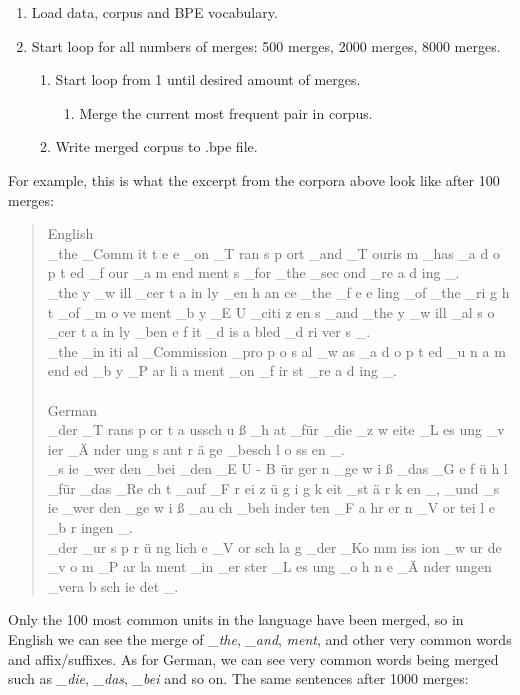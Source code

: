 \begin{enumerate}
	\item Load data, corpus and BPE vocabulary.
	\item Start loop for all numbers of merges: 500 merges, 2000 merges, 8000 merges.
	\begin{enumerate}
		\item Start loop from 1 until desired amount of merges.
		\begin{enumerate}
			\item Merge the current most frequent pair in corpus.
		\end{enumerate}
		\item Write merged corpus to .bpe file.
	\end{enumerate}
\end{enumerate}

For example, this is what the excerpt from the corpora above look like after 100 merges:

\begin{quote}
	English\\
	\_the \_Comm it t e e \_on \_T ran s p ort \_and \_T ouris m \_has \_a d o p t ed \_f our \_a m end ment s \_for \_the \_sec ond \_re a d ing \_.\\
	\_the y \_w ill \_cer t a in ly \_en h an ce \_the \_f e e ling \_of \_the \_ri g h t \_of \_m o ve ment \_b y \_E U \_citi z en s \_and \_the y \_w ill \_al s o \_cer t a in ly \_ben e f it \_d is a bled \_d ri ver s \_.\\
	\_the \_in iti al \_Commission \_pro p o s al \_w as \_a d o p t ed \_u n a m end ed \_b y \_P ar li a ment \_on \_f ir st \_re a d ing \_.\\\\
	German\\
	\_der \_T rans p or t a ussch u ß \_h at \_für \_die \_z w eite \_L es ung \_v ier \_Ä nder ung s ant r ä ge \_besch l o ss en \_.\\
	\_s ie \_wer den \_bei \_den \_E U - B ür ger n \_ge w i ß \_das \_G e f ü h l \_für \_das \_Re ch t \_auf \_F r ei z ü g i g k eit \_st ä r k en \_, \_und \_s ie \_wer den \_ge w i ß \_au ch \_beh inder ten \_F a hr er n \_V or tei l e \_b r ingen \_.\\
	\_der \_ur s p r ü ng lich e \_V or sch la g \_der \_Ko mm iss ion \_w ur de \_v o m \_P ar la ment \_in \_er ster \_L es ung \_o h n e \_Ä nder ungen \_vera b sch ie det \_.
\end{quote}

Only the 100 most common units in the language have been merged, so in English we can see the merge of \emph{\_the}, \emph{\_and}, \emph{ment}, and other very common words and affix/suffixes. As for German, we can see very common words being merged such as \emph{\_die}, \emph{\_das}, \emph{\_bei} and so on. The same sentences after 1000 merges:

